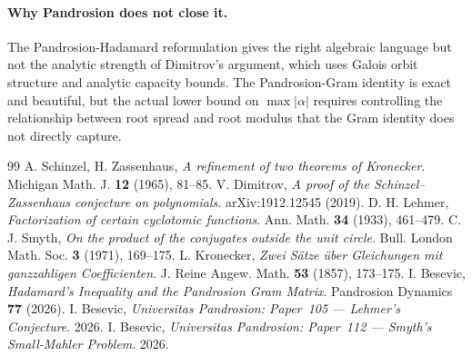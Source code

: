 \documentclass[11pt,a4paper]{article}
\begin{document}
\paragraph{Why Pandrosion does not close it.}
The Pandrosion-Hadamard reformulation gives the right algebraic language but
not the analytic strength of Dimitrov's argument, which uses Galois orbit
structure and analytic capacity bounds. The Pandrosion-Gram identity is exact
and beautiful, but the actual lower bound on $\max|\alpha|$ requires
controlling the relationship between root spread and root modulus that the
Gram identity does not directly capture.

\begin{thebibliography}{99}
 A. Schinzel, H. Zassenhaus, \textit{A refinement of two
theorems of Kronecker}. Michigan Math. J. \textbf{12} (1965), 81--85.
 V. Dimitrov, \textit{A proof of the Schinzel--Zassenhaus
conjecture on polynomials}. arXiv:1912.12545 (2019).
 D. H. Lehmer, \textit{Factorization of certain cyclotomic
functions}. Ann. Math. \textbf{34} (1933), 461--479.
 C. J. Smyth, \textit{On the product of the conjugates
outside the unit circle}. Bull. London Math. Soc. \textbf{3} (1971), 169--175.
 L. Kronecker, \textit{Zwei S\"atze \"uber Gleichungen
mit ganzzahligen Coefficienten}. J. Reine Angew. Math. \textbf{53} (1857),
173--175.
 I. Besevic, \textit{Hadamard's Inequality and the
Pandrosion Gram Matrix}. Pandrosion Dynamics \textbf{77} (2026).
 I. Besevic, \textit{Universitas Pandrosion: Paper~105 ---
Lehmer's Conjecture}. 2026.
 I. Besevic, \textit{Universitas Pandrosion: Paper~112 ---
Smyth's Small-Mahler Problem}. 2026.
\end{thebibliography}
\end{document}
